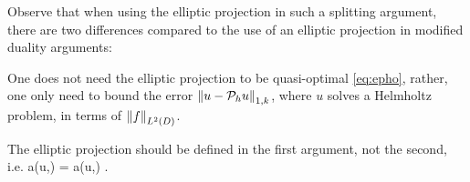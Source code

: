 Observe that when using the elliptic projection in such a splitting argument, there are two differences compared to the use of an elliptic projection in modified duality arguments:
\ben
\item One does not need the elliptic projection to be quasi-optimal \cref{eq:epho}, rather, one only need to bound the error $\NW{u-\Ph u}$, where $u$ solves a Helmholtz problem, in terms of $\NLtD{f}$.
\item The elliptic projection should be defined in the first argument, not the second, i.e.
  \beq\label{eq:ellprojfirst}
a(\Ph u,\vh) = a(u,\vh) \tforall \vh \in \Vhp.
  \eeq
\een








